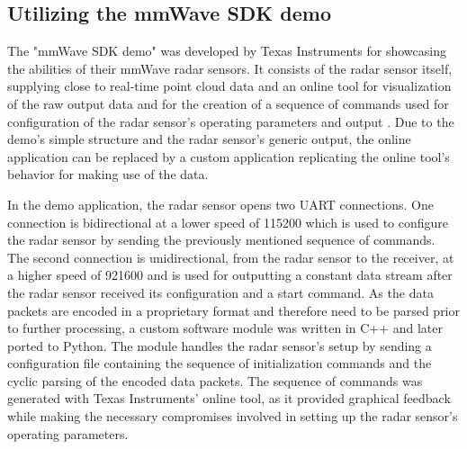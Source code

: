 \subsection{Utilizing the mmWave SDK demo}
The "mmWave SDK demo" was developed by Texas Instruments for showcasing the abilities of their mmWave radar sensors.
It consists of the radar sensor itself, supplying close to real-time point cloud data and an online tool for visualization of the raw output data and for the creation of a sequence of commands used for configuration of the radar sensor's operating parameters and output \cite{mmwave_demo_doc}.
Due to the demo's simple structure and the radar sensor's generic output, the online application can be replaced by a custom application replicating the online tool's behavior for making use of the data.
\par
In the demo application, the radar sensor opens two UART connections.
One connection is bidirectional at a lower speed of \SI{115200}{\baud} which is used to configure the radar sensor by sending the previously mentioned sequence of commands. 
The second connection is unidirectional, from the radar sensor to the receiver, at a higher speed of \SI{921600}{\baud} and is used for outputting a constant data stream after the radar sensor received its configuration and a start command.
As the data packets are encoded in a proprietary format and therefore need to be parsed prior to further processing, a custom software module was written in C++ and later ported to Python.
The module handles the radar sensor's setup by sending a configuration file containing the sequence of initialization commands and the cyclic parsing of the encoded data packets.
The sequence of commands was generated with Texas Instruments' online tool, as it provided graphical feedback while making the necessary compromises involved in setting up the radar sensor's operating parameters.

